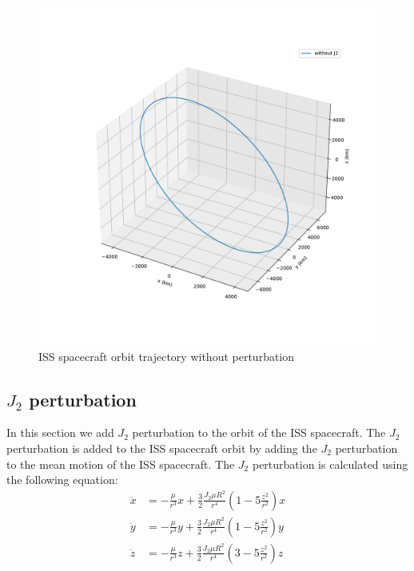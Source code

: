 \begin{figure}[H]
    \centering
    \includegraphics[width=1\textwidth]{../Figure/Q3/ISS_trajectory_no_per}
    \caption{ISS spacecraft orbit trajectory without perturbation}
\end{figure}
\subsection{$J_2$ perturbation}
In this section we add $J_2$ perturbation to the orbit of the ISS spacecraft. The $J_2$ perturbation is added to the ISS spacecraft orbit by adding the $J_2$ perturbation to the mean motion of the ISS spacecraft. The $J_2$ perturbation is calculated using the following equation:
\begin{equation}
    \begin{aligned}
        \ddot{x} &= -\frac{\mu}{r^3}x + \frac{3}{2} \frac{J_2 \mu R^2}{r^4} \left( 1 - 5 \frac{z^2}{r^2} \right) x \\
        \ddot{y} &= -\frac{\mu}{r^3}y + \frac{3}{2} \frac{J_2 \mu R^2}{r^4} \left( 1 - 5 \frac{z^2}{r^2} \right) y \\
        \ddot{z} &= -\frac{\mu}{r^3}z + \frac{3}{2} \frac{J_2 \mu R^2}{r^4} \left( 3 - 5 \frac{z^2}{r^2} \right) z \\
    \end{aligned}
\end{equation}

